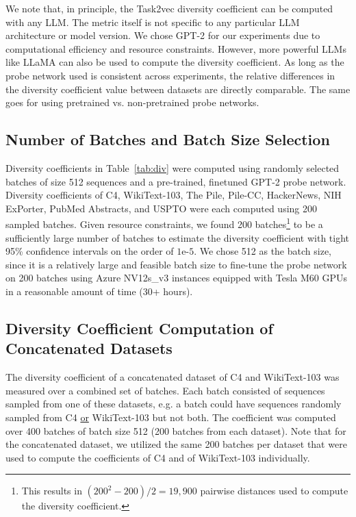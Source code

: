 We note that, in principle, the Task2vec diversity coefficient can be computed with any LLM. The metric itself is not specific to any particular LLM architecture or model version. We chose GPT-2 for our experiments due to computational efficiency and resource constraints. However, more powerful LLMs like LLaMA can also be used to compute the diversity coefficient. As long as the probe network used is consistent across experiments, the relative differences in the diversity coefficient value between datasets are directly comparable. The same goes for using pretrained vs. non-pretrained probe networks.

\subsection{Number of Batches and Batch Size Selection}
\label{appendix:parameter_selection}
Diversity coefficients in Table~\ref{tab:div} were computed using randomly selected batches of size 512 sequences and a pre-trained, finetuned GPT-2 probe network. Diversity coefficients of C4, WikiText-103, The Pile, Pile-CC, HackerNews, NIH ExPorter, PubMed Abstracts, and USPTO were each computed using 200 sampled batches. Given resource constraints, we found 200 batches\footnote{This results in $(200^2-200)/2 = 19,900$ pairwise distances used to compute the diversity coefficient.} to be a sufficiently large number of batches to estimate the diversity coefficient with tight 95\% confidence intervals on the order of $1\text{e-}5$. We chose 512 as the batch size, since it is a relatively large and feasible batch size to fine-tune the probe network on 200 batches using Azure NV12s\_v3 instances equipped with Tesla M60 GPUs in a reasonable amount of time (30+ hours). 

\subsection{Diversity Coefficient Computation of Concatenated Datasets}
\label{appendix:concat_datasets}
The diversity coefficient of a concatenated dataset of C4 and WikiText-103 was measured over a combined set of batches.
Each batch consisted of sequences sampled from one of these datasets, e.g. a batch could have sequences randomly sampled from C4 \underline{or} WikiText-103 but not both.
The coefficient was computed over 400 batches of batch size 512 (200 batches from each dataset). 
Note that for the concatenated dataset, we utilized the same 200 batches per dataset that were used to compute the coefficients of C4 and of WikiText-103 individually.

